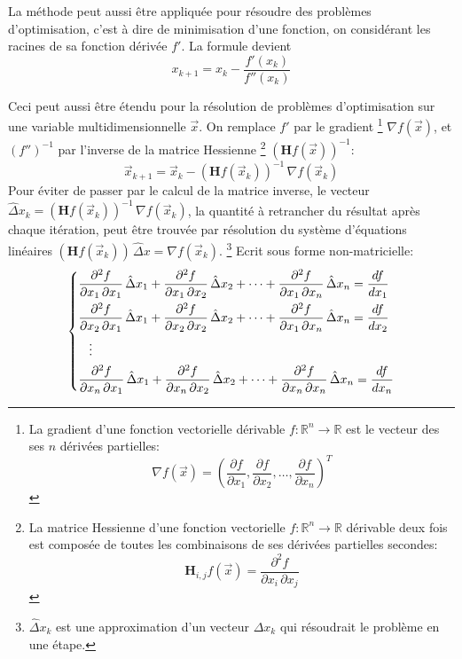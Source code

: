 \documentclass[a4paper,10pt]{scrreprt}
\begin{document}
La méthode peut aussi être appliquée pour résoudre des problèmes d'optimisation, c'est à dire de minimisation d'une fonction, on considérant les racines de sa fonction dérivée $f'$. La formule devient
\begin{equation*}
	x_{k+1} = x_{k} - \frac{f'(x_k)}{f''(x_k)}
\end{equation*}

Ceci peut aussi être étendu pour la résolution de problèmes d'optimisation sur une variable multidimensionnelle $\vec{x}$. On remplace $f'$ par le gradient
\footnote{La gradient d'une fonction vectorielle dérivable $f : \mathbb{R}^n \rightarrow \mathbb{R}$ est le vecteur des ses $n$ dérivées partielles: $$\nabla f(\vec{x}) = \left( \frac{\partial f}{\partial x_1}, \frac{\partial f}{\partial x_2}, \ldots, \frac{\partial f}{\partial x_n} \right)^T$$}
$\nabla f(\vec{x})$, et $(f'')^{-1}$ par l'inverse de la matrice Hessienne
\footnote{La matrice Hessienne d'une fonction vectorielle $f : \mathbb{R}^n \rightarrow \mathbb{R}$ dérivable deux fois est composée de toutes les combinaisons de ses dérivées partielles secondes: $$\mathbf{H}_{i,j} f(\vec{x}) = \frac{\partial^2 f}{\partial x_i \, \partial x_j}$$}
$( \mathbf{H} f(\vec{x}) )^{-1}$:
\begin{equation*}
	\vec{x}_{k+1} = \vec{x}_{k} - (\mathbf{H} f(\vec{x}_k))^{-1} \, \nabla f(\vec{x}_k)
\end{equation*}
Pour éviter de passer par le calcul de la matrice inverse, le vecteur $\hat{\Delta} x_k = (\mathbf{H} f(\vec{x}_k))^{-1} \, \nabla f(\vec{x}_k)$, la quantité à retrancher du résultat après chaque itération, peut être trouvée par résolution du système d'équations linéaires $(\mathbf{H} f(\vec{x}_k)) \, \hat{\Delta} x = \nabla f(\vec{x}_k)$.
\footnote{$\hat{\Delta} x_k$ est une approximation d'un vecteur $\Delta x_k$ qui résoudrait le problème en une étape.}
Ecrit sous forme non-matricielle:
\begin{equation*}
\begin{dcases}
	\frac{\partial^2 f}{\partial x_1 \, \partial x_1} \, \hat{\Delta} x_1 + \frac{\partial^2 f}{\partial x_1 \, \partial x_2} \, \hat{\Delta} x_2 + \dotsb + \frac{\partial^2 f}{\partial x_1 \, \partial x_n} \, \hat{\Delta} x_n = \frac{d f}{d x_1} \\
	\frac{\partial^2 f}{\partial x_2 \, \partial x_1} \, \hat{\Delta} x_1 + \frac{\partial^2 f}{\partial x_2 \, \partial x_2} \, \hat{\Delta} x_2 + \dotsb + \frac{\partial^2 f}{\partial x_1 \, \partial x_n} \, \hat{\Delta} x_n = \frac{d f}{d x_2} \\
	\hspace{3mm} \vdots \\
	\frac{\partial^2 f}{\partial x_n \, \partial x_1} \, \hat{\Delta} x_1 + \frac{\partial^2 f}{\partial x_n \, \partial x_2} \, \hat{\Delta} x_2 + \dotsb + \frac{\partial^2 f}{\partial x_n \, \partial x_n} \, \hat{\Delta} x_n = \frac{d f}{d x_n} \\
\end{dcases}
\end{equation*}
\end{document}
